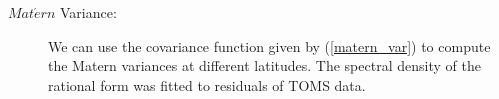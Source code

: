 \begin{description}
\item [{\bf $Mat\acute{e}rn$} Variance:] We can use the covariance function given by (\ref{matern_var}) to compute the Matern variances at different latitudes. The spectral density of the rational form was fitted to residuals of TOMS data.


\end{description}





%
%
